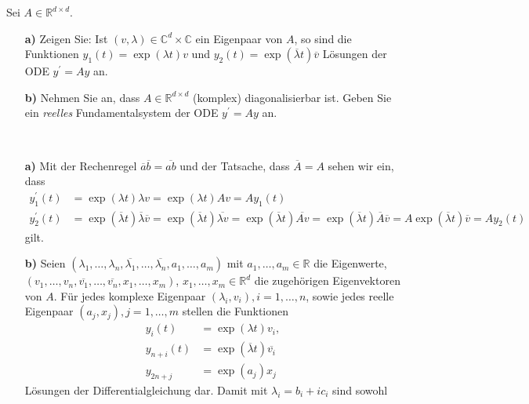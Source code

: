 \begin{exercise}
Sei $A \in \mathbb{R}^{d\times d}$.
\begin{itemize}
  \item [\textbf{a)}]Zeigen Sie: Ist $(v,\lambda) \in \mathbb{C}^d
  \times \mathbb{C}$ ein Eigenpaar von $A$, so sind die Funktionen
  $y_1(t) = \exp(\lambda t)v$ und $y_2(t) = \exp(\overline{\lambda}t)\overline{v}$
  Lösungen der ODE $y^{\prime} = Ay$ an.
  \item [\textbf{b)}] Nehmen Sie an, dass $A \in \mathbb{R}^
  {d \times d}$ (komplex) diagonalisierbar ist. Geben Sie ein
  \textit{reelles} Fundamentalsystem der ODE $y^{\prime} = Ay$ an.
\end{itemize}
\end{exercise}
\begin{solution}
\leavevmode \\
\begin{itemize}
  \item [\textbf{a)}]
  Mit der Rechenregel $\overline{a}\overline{b} = \overline{ab}$ und der Tatsache, dass $\overline{A} = A$
  sehen wir ein, dass
  \begin{align*}
    y_1^{\prime}(t) &= \exp(\lambda t)\lambda v = \exp(\lambda t)A v = Ay_1(t) \\
    y_2^{\prime}(t) &= \exp(\overline{\lambda}t)\overline{\lambda}\overline{v} = \exp(\overline{\lambda}t) \overline{\lambda v} =
    \exp(\overline{\lambda}t) \overline{Av} =  \exp(\overline{\lambda}t) \overline{A}\overline{v} = A\exp(\overline{\lambda}t)\overline{v} = Ay_2(t)
  \end{align*}
  gilt.
  \item [\textbf{b)}]
  Seien $(\lambda_1,\dots,\lambda_n,\overline{\lambda_1},\dots,\overline{\lambda_n},a_1,\dots,a_m)$
  mit $a_1,\dots,a_m \in \mathbb{R}$ die Eigenwerte, \\
  $(v_1,\dots,v_n,\overline{v_1},\dots,\overline{v_n},x_1,\dots,x_m)$, $x_1,\dots,x_m \in \mathbb{R}^d$
  die zugehörigen Eigenvektoren von $A$.
  Für jedes komplexe Eigenpaar $(\lambda_i, v_i), i = 1,\dots,n$, sowie jedes
  reelle Eigenpaar $(a_j,x_j), j = 1,\dots,m$ stellen die Funktionen
  \begin{align*}
    y_{i}(t) &= \exp(\lambda t)v_i, \\
    y_{n + i}(t) &= \exp(\overline{\lambda} t)\overline{v_i} \\
    y_{2n + j} &= \exp(a_j)x_j
  \end{align*}
  Lösungen der Differentialgleichung dar. Damit mit $\lambda_i = b_i + ic_i$ sind sowohl

\end{itemize}
\end{solution}
